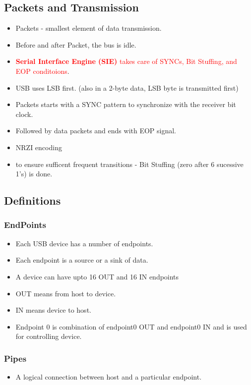 \documentclass{article}
\begin{document}
\subsection{Packets and Transmission}
\begin{itemize}
    \item Packets - smallest element of data transmission.
    \item Before and after Packet, the bus is idle.
    \item \textcolor{red}{\textbf{Serial Interface Engine (SIE)} takes care of SYNCs, Bit Stuffing, and EOP conditoions}.
    \item USB uses LSB first. (also in a 2-byte data, LSB byte is transmitted first)
    \item Packets starts with a SYNC pattern to synchronize with the receiver bit clock.
    \item Followed by data packets and ends with EOP signal.
    \item NRZI encoding
    \item to ensure sufficent frequent transitions - Bit Stuffing (zero after 6 sucessive 1's) is done.
\end{itemize}


\subsection{Definitions}
\subsubsection{EndPoints}
\begin{itemize}
    \item Each USB device has a number of endpoints.
    \item Each endpoint is a source or a sink of data.
    \item A device can have upto 16 OUT and 16 IN endpoints
    \item OUT means from host to device.
    \item IN means device to host.
    \item Endpoint 0 is combination of endpoint0 OUT and endpoint0 IN and is used for controlling device.
\end{itemize}

\subsubsection{Pipes}
\begin{itemize}
    \item A logical connection between host and a particular endpoint.
\end{itemize}
\end{document}
